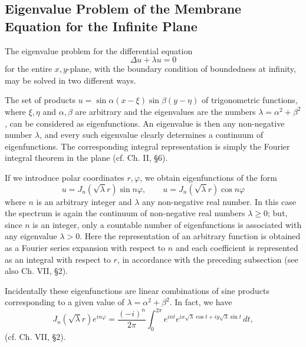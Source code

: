 \subsection{Eigenvalue Problem of the Membrane Equation for the Infinite Plane}
The eigenvalue problem for the differential equation
\[
\Delta u+\lambda u=0
\]
for the entire $x,y$-plane, with the boundary condition of boundedness at infinity, may be solved in two different ways.

The set of products $u=\sin\alpha(x-\xi)\sin\beta(y-\eta)$ of trigonometric functions, where $\xi,\eta$ and $\alpha,\beta$ are arbitrary and the eigenvalues are the numbers $\lambda=\alpha^2+\beta^2$, can be considered as eigenfunctions. An eigenvalue is then any non-negative number $\lambda$, and every such eigenvalue clearly determines a continuum of eigenfunctions. The corresponding integral representation is simply the Fourier integral theorem in the plane (cf. Ch. II, \S6).

If we introduce polar coordinates $r,\varphi$, we obtain eigenfunctions of the form
\[
u=J_n(\sqrt\lambda r)\sin n\varphi,\qquad u=J_n(\sqrt\lambda r)\cos n\varphi
\]
where $n$ is an arbitrary integer and $\lambda$ any non-negative real number. In this case the spectrum is again the continuum of non-negative real numbers $\lambda\ge0$; but, since $n$ is an integer, only a countable number of eigenfunctions is associated with any eigenvalue $\lambda>0$. Here the representation of an arbitrary function is obtained as a Fourier series expansion with respect to $n$ and each coefficient is represented as an integral with respect to $r$, in accordance with the preceding subsection (see also Ch. VII, \S2).

Incidentally these eigenfunctions are linear combinations of sine products corresponding to a given value of $\lambda=\alpha^2+\beta^2$. In fact, we have
\[
J_n(\sqrt\lambda r)e^{in\varphi}=\frac{(-i)^n}{2\pi}\int_0^{2\pi}e^{int}e^{ix\sqrt\lambda\cos t+iy\sqrt\lambda\sin t}\,dt,
\]
(cf. Ch. VII, \S2).

